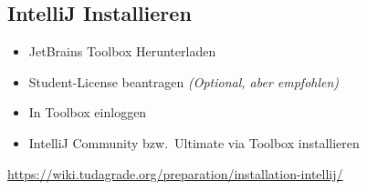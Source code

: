     \subsection{IntelliJ Installieren}\label{subsec:intellij-installieren}
    \begin{frame}[c]
        \slidehead
        \begin{itemize}
            [<+->]
            \item JetBrains Toolbox Herunterladen
            \item Student-License beantragen \textit{(Optional, aber empfohlen)}
            \item In Toolbox einloggen
            \item IntelliJ Community bzw.~Ultimate via Toolbox installieren
        \end{itemize}
        \vspace{2em}
        \small
        \centering
        \url{https://wiki.tudagrade.org/preparation/installation-intellij/}
    \end{frame}


